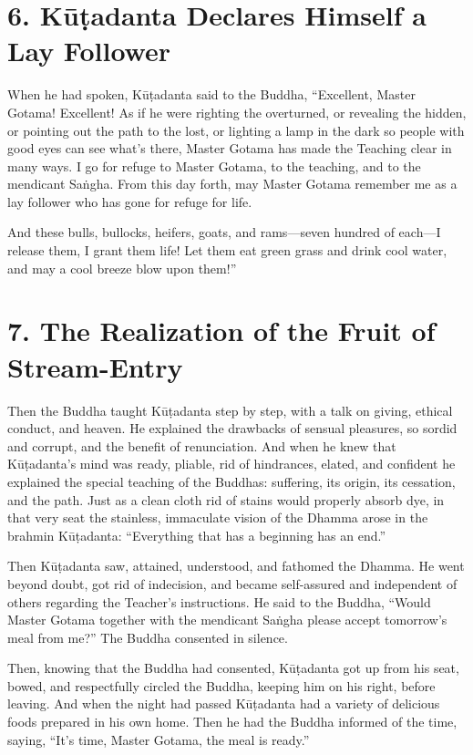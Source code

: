 \documentclass[12pt,openany]{book}%
\begin{document}
\section*{6. \textsanskrit{Kūṭadanta} Declares Himself a Lay Follower }

When he had spoken, \textsanskrit{Kūṭadanta} said to the Buddha, “Excellent, Master Gotama! Excellent! As if he were righting the overturned, or revealing the hidden, or pointing out the path to the lost, or lighting a lamp in the dark so people with good eyes can see what’s there, Master Gotama has made the Teaching clear in many ways. I go for refuge to Master Gotama, to the teaching, and to the mendicant \textsanskrit{Saṅgha}. From this day forth, may Master Gotama remember me as a lay follower who has gone for refuge for life. 

And these bulls, bullocks, heifers, goats, and rams—seven hundred of each—I release them, I grant them life! Let them eat green grass and drink cool water, and may a cool breeze blow upon them!” 

\section*{7. The Realization of the Fruit of Stream-Entry }

Then the Buddha taught \textsanskrit{Kūṭadanta} step by step, with a talk on giving, ethical conduct, and heaven. He explained the drawbacks of sensual pleasures, so sordid and corrupt, and the benefit of renunciation. And when he knew that \textsanskrit{Kūṭadanta}’s mind was ready, pliable, rid of hindrances, elated, and confident he explained the special teaching of the Buddhas: suffering, its origin, its cessation, and the path. Just as a clean cloth rid of stains would properly absorb dye, in that very seat the stainless, immaculate vision of the Dhamma arose in the brahmin \textsanskrit{Kūṭadanta}: “Everything that has a beginning has an end.” 

Then \textsanskrit{Kūṭadanta} saw, attained, understood, and fathomed the Dhamma. He went beyond doubt, got rid of indecision, and became self-assured and independent of others regarding the Teacher’s instructions. He said to the Buddha, “Would Master Gotama together with the mendicant \textsanskrit{Saṅgha} please accept tomorrow’s meal from me?” The Buddha consented in silence. 

Then, knowing that the Buddha had consented, \textsanskrit{Kūṭadanta} got up from his seat, bowed, and respectfully circled the Buddha, keeping him on his right, before leaving. And when the night had passed \textsanskrit{Kūṭadanta} had a variety of delicious foods prepared in his own home. Then he had the Buddha informed of the time, saying, “It’s time, Master Gotama, the meal is ready.” 
\end{document}
